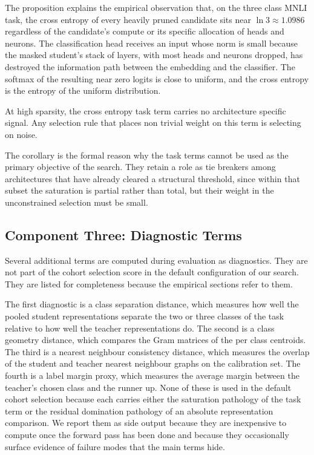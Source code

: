 The proposition explains the empirical observation that, on the three class MNLI task, the cross entropy of every heavily pruned candidate sits near $\ln 3 \approx 1.0986$ regardless of the candidate's compute or its specific allocation of heads and neurons. The classification head receives an input whose norm is small because the masked student's stack of layers, with most heads and neurons dropped, has destroyed the information path between the embedding and the classifier. The softmax of the resulting near zero logits is close to uniform, and the cross entropy is the entropy of the uniform distribution.

\begin{corollary}
At high sparsity, the cross entropy task term carries no architecture specific signal. Any selection rule that places non trivial weight on this term is selecting on noise.
\end{corollary}

The corollary is the formal reason why the task terms cannot be used as the primary objective of the search. They retain a role as tie breakers among architectures that have already cleared a structural threshold, since within that subset the saturation is partial rather than total, but their weight in the unconstrained selection must be small.

\subsection{Component Three: Diagnostic Terms}

Several additional terms are computed during evaluation as diagnostics. They are not part of the cohort selection score in the default configuration of our search. They are listed for completeness because the empirical sections refer to them.

The first diagnostic is a class separation distance, which measures how well the pooled student representations separate the two or three classes of the task relative to how well the teacher representations do. The second is a class geometry distance, which compares the Gram matrices of the per class centroids. The third is a nearest neighbour consistency distance, which measures the overlap of the student and teacher nearest neighbour graphs on the calibration set. The fourth is a label margin proxy, which measures the average margin between the teacher's chosen class and the runner up. None of these is used in the default cohort selection because each carries either the saturation pathology of the task term or the residual domination pathology of an absolute representation comparison. We report them as side output because they are inexpensive to compute once the forward pass has been done and because they occasionally surface evidence of failure modes that the main terms hide.

